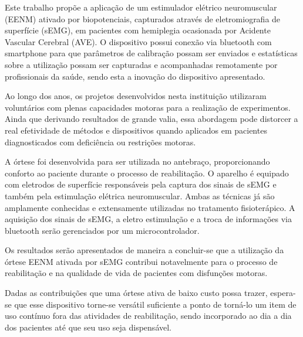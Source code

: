 \documentclass[rascunho,xindy]{fei}
\begin{document}
\begin{resumo}

Este trabalho propõe a aplicação de um estimulador elétrico neuromuscular (EENM) ativado por biopotenciais, capturados através de eletromiografia de superfície (sEMG), em pacientes com hemiplegia ocasionada por Acidente Vascular Cerebral (AVE). O dispositivo possui conexão via bluetooth com smartphone para que parâmetros de calibração possam ser enviados e estatísticas sobre a utilização possam ser capturadas e acompanhadas remotamente por profissionais da saúde, sendo esta a inovação do dispositivo apresentado.
	
Ao longo dos anos, os projetos desenvolvidos nesta instituição utilizaram voluntários com plenas capacidades motoras para a realização de experimentos. Ainda que derivando resultados de grande valia, essa abordagem pode distorcer a real efetividade de métodos e dispositivos quando aplicados em pacientes diagnosticados com deficiência ou restrições motoras. 

A órtese foi desenvolvida para ser utilizada no antebraço, proporcionando conforto ao paciente durante o processo de reabilitação. O aparelho é equipado com eletrodos de superfície responsáveis pela captura dos sinais de sEMG e também pela estimulação elétrica neuromuscular. Ambas as técnicas já são amplamente conhecidas e extensamente utilizadas no tratamento fisioterápico. A aquisição dos sinais de sEMG, a eletro estimulação e a troca de informações via bluetooth serão gerenciados por um microcontrolador.

Os resultados serão apresentados de maneira a concluir-se que a utilização da órtese EENM ativada por sEMG contribui notavelmente para o processo de reabilitação e na qualidade de vida de pacientes com disfunções motoras.

Dadas as contribuições que uma órtese ativa de baixo custo possa trazer, espera-se que esse dispositivo torne-se versátil suficiente a ponto de torná-lo um item de uso contínuo fora das atividades de reabilitação, sendo incorporado ao dia a dia dos pacientes até que seu uso seja dispensável.  



\end{resumo}
\end{document}
